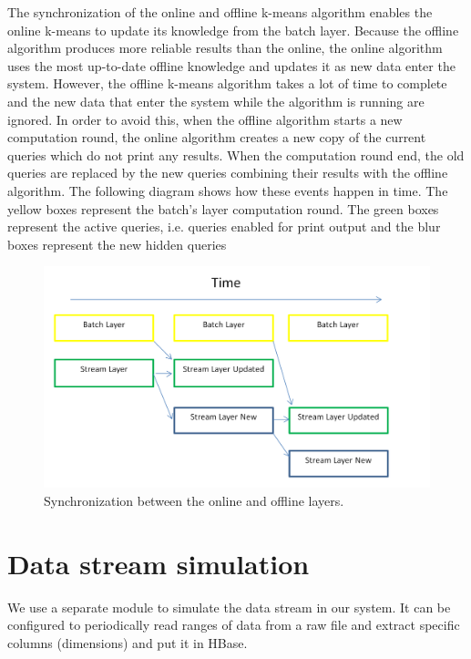 \documentclass{lmproj}
\begin{document}
The synchronization of the online and offline k-means algorithm enables the online k-means to update its knowledge from the batch layer. Because the offline algorithm produces more reliable results than the online, the online algorithm uses the most up-to-date offline knowledge and updates it as new data enter the system. However, the offline k-means algorithm takes a lot of time to complete and the new data that enter the system while the algorithm is running are ignored. In order to avoid this, when the offline algorithm starts a new computation round, the online algorithm creates a new copy of the current queries which do not print any results. When the computation round end, the old queries are replaced by the new queries combining their results with the offline algorithm. The following diagram shows how these events happen in time. The yellow boxes represent the batch’s layer computation round. The green boxes represent the active queries, i.e. queries enabled for print output and the blur boxes represent the new hidden queries 

\begin{figure}[H]
	\centering	
	\includegraphics[scale=0.4]{synchronization}
	\caption{Synchronization between the online and offline layers.}
\end{figure}

\section{Data stream simulation}
\label{systemdescr}
We use a separate module to simulate the data stream in our system. It can be configured to periodically read ranges of data from a raw file and extract specific columns (dimensions) and put it in HBase. 



\end{document}
